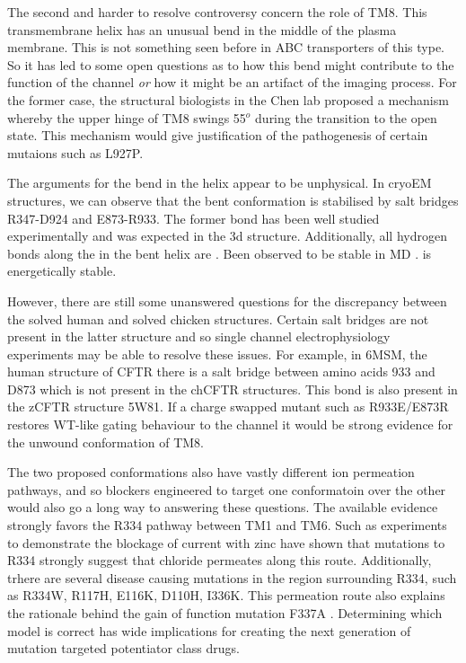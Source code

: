 The second and harder to resolve controversy concern the role of TM8. This transmembrane helix has an unusual bend in the middle of the plasma membrane. This is not something seen before in ABC transporters of this type. So it has led to some open questions as to how this bend might contribute to the function of the channel \textit{or} how it might be an artifact of the imaging process. For the former case, the structural biologists in the Chen lab proposed a mechanism whereby the upper hinge of TM8 swings 55$^o$ during the transition to the open state. This mechanism would give justification of the pathogenesis of certain mutaions such as L927P. 

The arguments for the bend in the helix appear to be unphysical. In cryoEM structures, we can observe that the bent conformation is stabilised by salt bridges R347-D924 and E873-R933. The former bond has been well studied experimentally and was expected in the 3d structure. Additionally, all hydrogen bonds along the in the bent helix are . Been observed to be stable in MD \cite{corradi2018} .  is energetically stable.

However, there are still some unanswered questions for the discrepancy between the solved human and solved chicken structures. Certain salt bridges are not present in the latter structure and so single channel electrophysiology experiments may be able to resolve these issues. For example, in 6MSM, the human structure of CFTR there is a salt bridge between amino acids 933 and D873 which is not present in the chCFTR structures. This bond is also present in the zCFTR structure 5W81. If a charge swapped mutant such as R933E/E873R restores WT-like gating behaviour to the channel it would be  strong evidence for the unwound conformation of TM8. 

The two proposed conformations also have vastly different ion permeation pathways, and so blockers engineered to target one conformatoin over the other would also go a long way to answering these questions. The available evidence strongly favors the R334 pathway between TM1 and TM6. Such as experiments to  demonstrate the blockage of current with zinc have shown that mutations to R334 strongly suggest that chloride permeates along this route. Additionally, trhere are several disease causing mutations in the region surrounding R334, such as R334W, R117H, E116K, D110H, I336K\cite{cftr2}. This permeation route also explains the rationale behind the gain of function mutation F337A \cite{}. Determining which model is correct has wide implications for creating the next generation of mutation targeted potentiator class drugs.

